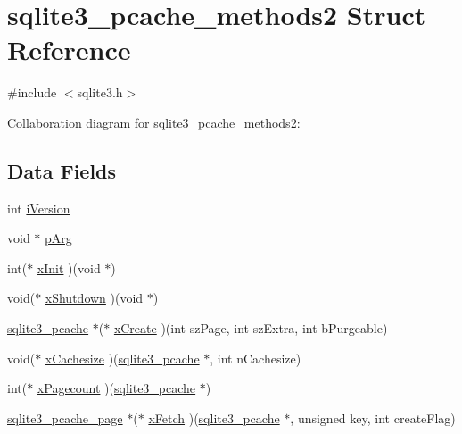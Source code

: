 \hypertarget{structsqlite3__pcache__methods2}{}\section{sqlite3\+\_\+pcache\+\_\+methods2 Struct Reference}
\label{structsqlite3__pcache__methods2}


{\ttfamily \#include $<$sqlite3.\+h$>$}



Collaboration diagram for sqlite3\+\_\+pcache\+\_\+methods2\+:
\subsection*{Data Fields}
\begin{DoxyCompactItemize}
\item 
int \hyperlink{structsqlite3__pcache__methods2_a1138620d71393e6105389670719d9685}{i\+Version}
\item 
void $\ast$ \hyperlink{structsqlite3__pcache__methods2_a3717fa60d029e21cf1253154e5bdd969}{p\+Arg}
\item 
int($\ast$ \hyperlink{structsqlite3__pcache__methods2_a707c4748dcafc75384a806d13bb68bdd}{x\+Init} )(void $\ast$)
\item 
void($\ast$ \hyperlink{structsqlite3__pcache__methods2_a34a88425495f42099aadbe3fa9676a06}{x\+Shutdown} )(void $\ast$)
\item 
\hyperlink{sqlite3_8c_a096c453d937d51f7926d7d31c8e0bd2f}{sqlite3\+\_\+pcache} $\ast$($\ast$ \hyperlink{structsqlite3__pcache__methods2_ab9a93020ba292bd881352f4e04235541}{x\+Create} )(int sz\+Page, int sz\+Extra, int b\+Purgeable)
\item 
void($\ast$ \hyperlink{structsqlite3__pcache__methods2_a1a71e7cecb9abff1fcc9594e0120091b}{x\+Cachesize} )(\hyperlink{sqlite3_8c_a096c453d937d51f7926d7d31c8e0bd2f}{sqlite3\+\_\+pcache} $\ast$, int n\+Cachesize)
\item 
int($\ast$ \hyperlink{structsqlite3__pcache__methods2_a2b94d01bdb0e2496c486b48a37a00fea}{x\+Pagecount} )(\hyperlink{sqlite3_8c_a096c453d937d51f7926d7d31c8e0bd2f}{sqlite3\+\_\+pcache} $\ast$)
\item 
\hyperlink{structsqlite3__pcache__page}{sqlite3\+\_\+pcache\+\_\+page} $\ast$($\ast$ \hyperlink{structsqlite3__pcache__methods2_a7353726473e016e2920a8c1c5821f495}{x\+Fetch} )(\hyperlink{sqlite3_8c_a096c453d937d51f7926d7d31c8e0bd2f}{sqlite3\+\_\+pcache} $\ast$, unsigned key, int create\+Flag)
\item 

\end{DoxyCompactItemize}
